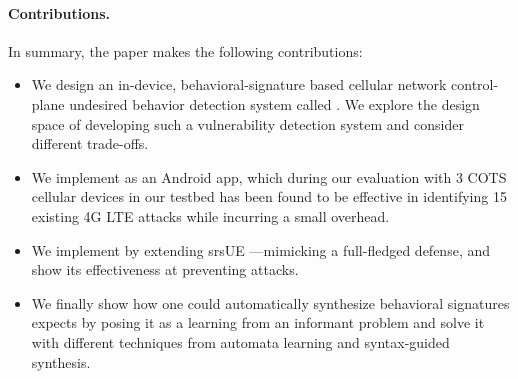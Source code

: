 \paragraph*{Contributions.}
In summary, the paper makes the following  contributions:
\begin{itemize}\setlength{\itemsep}{0em}
	\item %
	We design an in-device, behavioral-signature based
	cellular network control-plane undesired behavior detection system called \system.
	We explore the design space of developing such a vulnerability detection system and consider
	different trade-offs.
	\item We implement \system as an Android app, which during our evaluation with
	3 COTS cellular devices in our testbed has been found to be effective
	in identifying 15 existing 4G LTE attacks while incurring a small overhead.

	\item We implement \system by extending srsUE \cite{gomez2016srslte}---mimicking  a full-fledged
	defense, and show its effectiveness at preventing
	attacks. %
	\item We finally show how one could automatically synthesize behavioral signatures \system expects by
	posing it as a learning from an informant problem \cite{informant_learning} and solve it with different
	techniques from automata learning and syntax-guided synthesis.
\end{itemize}
